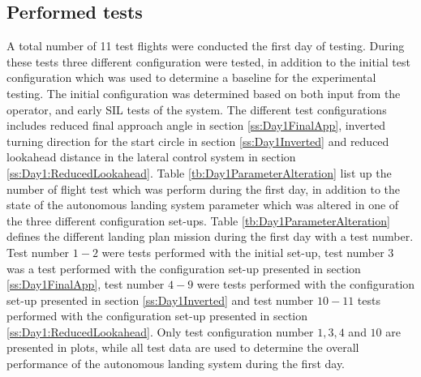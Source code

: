 \subsection{Performed tests}
A total number of 11 test flights were conducted the first day of testing. During these tests three different configuration were tested, in addition to the initial test configuration which was used to determine a baseline for the experimental testing. The initial configuration was determined based on both input from the operator, and early SIL tests of the system. The different test configurations includes reduced final approach angle in section \ref{ss:Day1FinalApp}, inverted turning direction for the start circle in section \ref{ss:Day1Inverted} and reduced lookahead distance in the lateral control system in section \ref{ss:Day1:ReducedLookahead}. Table \ref{tb:Day1ParameterAlteration} list up the number of flight test which was perform during the first day, in addition to the state of the autonomous landing system parameter which was altered in one of the three different configuration set-ups. Table \ref{tb:Day1ParameterAlteration} defines the different landing plan mission during the first day with a test number. Test number $1-2$ were tests performed with the initial set-up, test number $3$ was a test performed with the configuration set-up presented in section \ref{ss:Day1FinalApp}, test number $4-9$ were tests performed with the configuration set-up presented in section \ref{ss:Day1Inverted} and test number $10-11$ tests performed with the configuration set-up presented in section \ref{ss:Day1:ReducedLookahead}.  Only test configuration number $1,3,4$ and $10$ are presented in plots, while all test data are used to determine the overall performance of the autonomous landing system during the first day.
